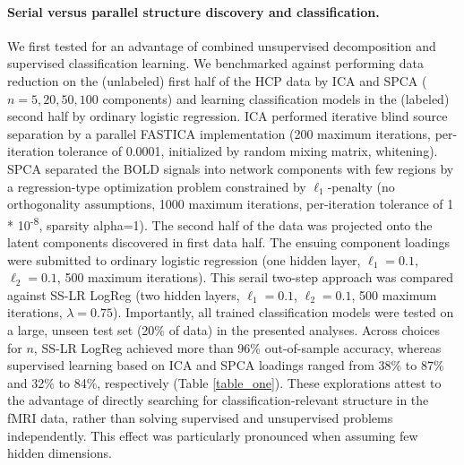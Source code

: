 \documentclass{article} %
\begin{document}
\paragraph{Serial versus parallel structure discovery and classification.}
We first tested for an advantage of combined unsupervised decomposition
and supervised classification learning.
We benchmarked against
performing data reduction on the (unlabeled)
first half of the HCP data by ICA and SPCA ($n=5, 20, 50, 100$ components)
and learning classification models in the (labeled) second half
by ordinary logistic regression.
%
ICA performed iterative blind source separation
by a parallel FASTICA implementation (200 maximum iterations,
per-iteration tolerance of 0.0001,
initialized by random mixing matrix, whitening).
SPCA separated the BOLD signals into
network components with few regions by
a regression-type optimization problem constrained by
$\ell_1$-penalty
(no orthogonality assumptions, 1000 maximum iterations,
per-iteration tolerance of 1 * 10\textsuperscript{-8}, sparsity
alpha=1).
%
The second half of the data was projected onto the
latent components discovered in first data half.
The ensuing component loadings were submitted to ordinary
logistic regression
(one hidden layer, $\ell_1=0.1$, $\ell_2=0.1$, 500 maximum iterations).
%
This serail two-step approach was
compared against SS-LR LogReg
(two hidden layers, $\ell_1=0.1$, $\ell_2=0.1$,
500 maximum iterations, $\lambda=0.75$).
Importantly, all trained classification models were tested
on a large, unseen test set (20\% of data) in the presented analyses.
%
Across choices for $n$, SS-LR LogReg
achieved more than 96\% out-of-sample accuracy, whereas
supervised learning based on ICA and SPCA loadings
ranged from 38\% to 87\%
and
32\% to 84\%, respectively (Table \ref{table_one}).
%
These explorations attest to the advantage of directly searching for
classification-relevant structure in the fMRI data,
rather than solving supervised and unsupervised problems independently.
This effect was particularly pronounced when assuming few hidden dimensions.

\begin{table}[h]
 \centering
 \vspace{-0.2cm}
 \caption{Serial versus parallel dimensionality reduction and classification
XXX: only one decimal is meaningful}
 \label{table_one}
 \end{table}
\end{document}
